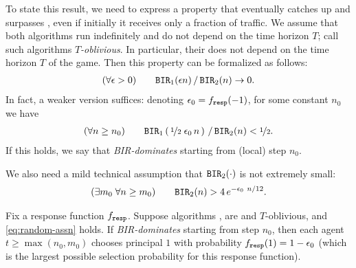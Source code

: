 To state this result, we need to express a property that \alg[1] eventually catches up and surpasses \alg[2], even if initially it receives only a fraction of traffic. We assume that both algorithms run indefinitely and do not depend on the time horizon $T$; call such algorithms \emph{$T$-oblivious}. In particular, their \BIR does not depend on the time horizon $T$ of the game.  Then this property can be formalized as follows:
\begin{align}\label{eq:random-better-clean}
(\forall \epsilon>0)\qquad
\mathtt{BIR}_1(\epsilon n)\,/\,\mathtt{BIR}_2(n) \to 0.
\end{align}
In fact, a weaker version suffices:
denoting $\epsilon_0 = f_{\mathtt{resp}}(-1)$, for some constant $n_0$ we have
\begin{align}\label{eq:random-better-weaker}
(\forall n\geq n_0) \qquad
\mathtt{BIR}_1\left(\,\nicefrac{1}{2}\;\epsilon_0\, n\,\right)\,/\, \mathtt{BIR}_2(n)<\nicefrac12.
\end{align}
If this holds, we say that \alg[1] \emph{BIR-dominates} \alg[2] starting from (local) step $n_0$.

We also need a mild technical assumption that $\mathtt{BIR}_2(\cdot)$ is not extremely small:
\begin{align}\label{eq:random-assn}
 (\exists m_0\;\forall n\geq m_0) \qquad
  \mathtt{BIR}_2(n) > 4\,e^{-\epsilon_0\ n/12}.
\end{align}


\begin{theorem}\label{thm:random-clean}
Fix a \HardMaxRandom response function $f_{\mathtt{resp}}$. Suppose algorithms \alg[1], \alg[2] are \bmonotone and $T$-oblivious, and \eqref{eq:random-assn} holds. If \alg[1] \emph{BIR-dominates} \alg[2] starting from step $n_0$, then each agent $t\geq \max(n_0,m_0)$ chooses principal $1$ with probability $f_{\mathtt{resp}}(1) = 1- \epsilon_0$ (which is the largest possible selection probability for this response function).
\end{theorem}





